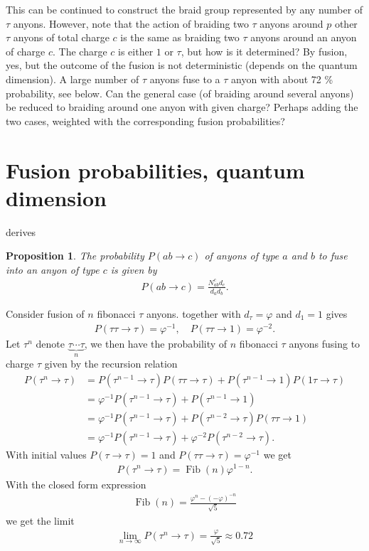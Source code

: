 \documentclass[a4paper,10pt,oneside]{book}
\theoremstyle{plain}
\newtheorem{proposition}[theorem]{Proposition}
\theoremstyle{definition}
\theoremstyle{remark}
\DeclareMathOperator{\Fib}{Fib}
\begin{document}
{This can be continued to construct the braid group represented by any number of $\tau$ anyons. However, note that the action of braiding two $\tau$ anyons around $p$ other $\tau$ anyons of total charge $c$ is the same as braiding two $\tau$ anyons around an anyon of charge $c$. The charge $c$ is either $1$ or $\tau$, but how is it determined? By fusion, yes, but the outcome of the fusion is not deterministic (depends on the quantum dimension). A large number of $\tau$ anyons fuse to a $\tau$ anyon with about 72 \% probability, see below. Can the general case (of braiding around several anyons) be reduced to braiding around one anyon with given charge? Perhaps adding the two cases, weighted with the corresponding fusion probabilities?

\section{Fusion probabilities, quantum dimension}

\cite{preskill} derives

\begin{proposition}\label{fusion probability}
  The probability $P(ab \to c)$ of anyons of type $a$ and $b$ to fuse into an anyon of type $c$ is given by
  \begin{align*}
    P(ab \to c) = \frac{N_{ab}^c d_c}{d_a d_b}.
  \end{align*}
\end{proposition}

Consider fusion of $n$ fibonacci $\tau$ anyons.  together with $d_\tau = \varphi$ and $d_1 = 1$ gives
\begin{align*}
  P(\tau\tau \to \tau) = \varphi^{-1}, \quad P(\tau\tau \to 1) = \varphi^{-2}.
\end{align*}
Let $\tau^n$ denote $\underbrace{\tau\cdots\tau}_{n}$, we then have the probability of $n$ fibonacci $\tau$ anyons fusing to charge $\tau$ given by the recursion relation
\begin{align*}
  P(\tau^n \to \tau)
  &= P(\tau^{n-1} \to \tau) P(\tau \tau \to \tau) + P(\tau^{n-1} \to 1) P(1\tau \to \tau) \\
  &= \varphi^{-1} P(\tau^{n-1} \to \tau) + P(\tau^{n-1} \to 1)\\
  &= \varphi^{-1} P(\tau^{n-1} \to \tau) + P(\tau^{n-2} \to \tau) P(\tau\tau \to 1)\\
  &= \varphi^{-1} P(\tau^{n-1} \to \tau) + \varphi^{-2} P(\tau^{n-2} \to \tau).
\end{align*}
With initial values $P(\tau \to \tau) = 1$ and $P(\tau\tau \to \tau) = \varphi^{-1}$ we get
\begin{align*}
  P(\tau^n \to \tau) = \Fib(n) \varphi^{1-n}.
\end{align*}
With the closed form expression
\begin{align*}
  \Fib(n) = \frac{\varphi^n-(-\varphi)^{-n}}{\sqrt{5}}
\end{align*}
we get the limit
\begin{align*}
  \lim_{n\to\infty} P(\tau^n \to \tau) = \frac{\varphi}{\sqrt{5}} \approx 0.72
\end{align*}

}
\end{document}
